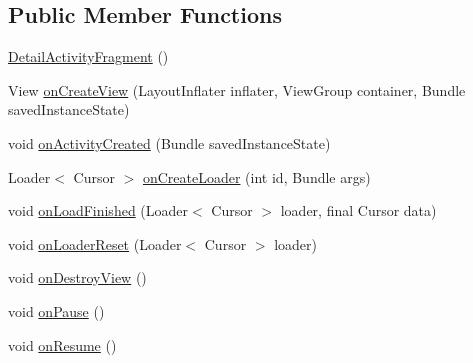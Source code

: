 \subsection*{Public Member Functions}
\begin{DoxyCompactItemize}
\item 
\hyperlink{classorg_1_1buildmlearn_1_1dictation_1_1fragment_1_1DetailActivityFragment_a51b6ca39544473790e9e8575d6ddecfc}{Detail\+Activity\+Fragment} ()
\item 
View \hyperlink{classorg_1_1buildmlearn_1_1dictation_1_1fragment_1_1DetailActivityFragment_a48883d786f099d8e16c4c5449ed9a116}{on\+Create\+View} (Layout\+Inflater inflater, View\+Group container, Bundle saved\+Instance\+State)
\item 
void \hyperlink{classorg_1_1buildmlearn_1_1dictation_1_1fragment_1_1DetailActivityFragment_a72fc2786c8a2ad5f74e33e1f89b96a8d}{on\+Activity\+Created} (Bundle saved\+Instance\+State)
\item 
Loader$<$ Cursor $>$ \hyperlink{classorg_1_1buildmlearn_1_1dictation_1_1fragment_1_1DetailActivityFragment_aa97abc7f56e59bf4d41f421ee9821824}{on\+Create\+Loader} (int id, Bundle args)
\item 
void \hyperlink{classorg_1_1buildmlearn_1_1dictation_1_1fragment_1_1DetailActivityFragment_af6063e5e44ce1f67cbc77b91d575199a}{on\+Load\+Finished} (Loader$<$ Cursor $>$ loader, final Cursor data)
\item 
void \hyperlink{classorg_1_1buildmlearn_1_1dictation_1_1fragment_1_1DetailActivityFragment_a621bc6e0e10d26bef26aff9f465ecf06}{on\+Loader\+Reset} (Loader$<$ Cursor $>$ loader)
\item 
void \hyperlink{classorg_1_1buildmlearn_1_1dictation_1_1fragment_1_1DetailActivityFragment_a80b861e03666b9bc0e99f4faeaabf222}{on\+Destroy\+View} ()
\item 
void \hyperlink{classorg_1_1buildmlearn_1_1dictation_1_1fragment_1_1DetailActivityFragment_aff7266089074b1677af73952313ab97f}{on\+Pause} ()
\item 
void \hyperlink{classorg_1_1buildmlearn_1_1dictation_1_1fragment_1_1DetailActivityFragment_a675a5a977281538ef5f1f453fa68268b}{on\+Resume} ()
\end{DoxyCompactItemize}
